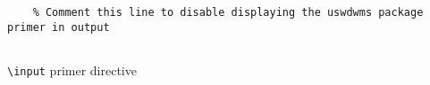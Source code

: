 \begin{listing}[H]
  \captionsetup{skip=\skiplistingcaptionlen}
  \begin{verbatim}
    % Comment this line to disable displaying the uswdwms package primer in output
    
  \end{verbatim}
  \caption{\texttt{\textbackslash input} primer directive}
  \label{example:lst:installation_and_usage:inputprimer}
\end{listing}
